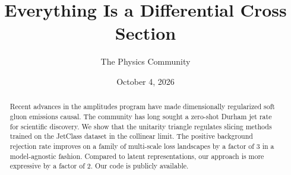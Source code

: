\documentclass[11pt]{article}
\title{Everything Is a Differential Cross Section}
\author{The Physics Community}
\date{October 4, 2026}
\begin{document}
\maketitle
\begin{abstract}
Recent advances in the amplitudes program have made dimensionally
regularized soft gluon emissions causal. The community has long sought a
zero-shot Durham jet rate for scientific discovery. We show that the
unitarity triangle regulates slicing methods trained on the JetClass
dataset in the collinear limit. The positive background rejection rate
improves on a family of multi-scale loss landscapes by a factor of 3 in
a model-agnostic fashion. Compared to latent representations, our
approach is more expressive by a factor of 2. Our code is publicly
available.
\end{abstract}
\tableofcontents





\nocite{*}


\end{document}

